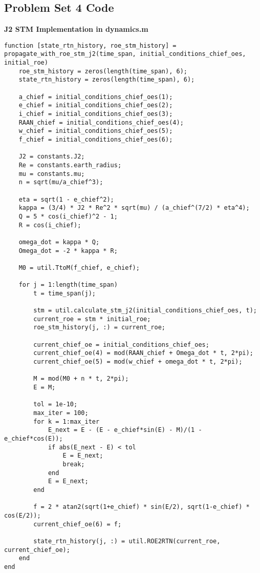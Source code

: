 \subsection{Problem Set 4 Code}

\textbf{J2 STM Implementation in dynamics.m}
\begin{lstlisting}
function [state_rtn_history, roe_stm_history] = propagate_with_roe_stm_j2(time_span, initial_conditions_chief_oes, initial_roe)  
    roe_stm_history = zeros(length(time_span), 6);
    state_rtn_history = zeros(length(time_span), 6);
    
    a_chief = initial_conditions_chief_oes(1);
    e_chief = initial_conditions_chief_oes(2);
    i_chief = initial_conditions_chief_oes(3);
    RAAN_chief = initial_conditions_chief_oes(4);
    w_chief = initial_conditions_chief_oes(5);
    f_chief = initial_conditions_chief_oes(6);
    
    J2 = constants.J2;
    Re = constants.earth_radius;
    mu = constants.mu;
    n = sqrt(mu/a_chief^3);
    
    eta = sqrt(1 - e_chief^2);
    kappa = (3/4) * J2 * Re^2 * sqrt(mu) / (a_chief^(7/2) * eta^4);
    Q = 5 * cos(i_chief)^2 - 1;
    R = cos(i_chief);
    
    omega_dot = kappa * Q;
    Omega_dot = -2 * kappa * R;
    
    M0 = util.TtoM(f_chief, e_chief);
    
    for j = 1:length(time_span)
        t = time_span(j);
        
        stm = util.calculate_stm_j2(initial_conditions_chief_oes, t);
        current_roe = stm * initial_roe;
        roe_stm_history(j, :) = current_roe;
       
        current_chief_oe = initial_conditions_chief_oes;
        current_chief_oe(4) = mod(RAAN_chief + Omega_dot * t, 2*pi);
        current_chief_oe(5) = mod(w_chief + omega_dot * t, 2*pi);
        
        M = mod(M0 + n * t, 2*pi);
        E = M;
        
        tol = 1e-10;
        max_iter = 100;
        for k = 1:max_iter
            E_next = E - (E - e_chief*sin(E) - M)/(1 - e_chief*cos(E));
            if abs(E_next - E) < tol
                E = E_next;
                break;
            end
            E = E_next;
        end
        
        f = 2 * atan2(sqrt(1+e_chief) * sin(E/2), sqrt(1-e_chief) * cos(E/2));
        current_chief_oe(6) = f;
        
        state_rtn_history(j, :) = util.ROE2RTN(current_roe, current_chief_oe);
    end
end
\end{lstlisting}


